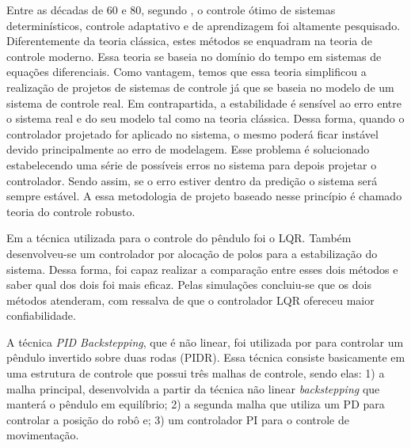 Entre as décadas de 60 e 80, segundo \cite{Ogata}, o controle ótimo de sistemas determinísticos, controle adaptativo e de aprendizagem foi altamente pesquisado. Diferentemente da teoria clássica, estes métodos se enquadram na teoria de controle moderno. Essa teoria se baseia no domínio do tempo em sistemas de equações diferenciais. Como vantagem, temos que essa teoria simplificou a realização de projetos de sistemas de controle já que se baseia no modelo de um sistema de controle real. Em contrapartida, a estabilidade é sensível ao erro entre o sistema real e do seu modelo tal como na teoria clássica. Dessa forma, quando o controlador projetado for aplicado no sistema, o mesmo poderá ficar instável devido principalmente ao erro de modelagem. Esse problema é solucionado estabelecendo uma série de possíveis erros no sistema para depois projetar o controlador. Sendo assim, se o erro estiver dentro da predição o sistema será sempre estável. A essa metodologia de projeto baseado nesse princípio é chamado teoria do controle robusto.



Em \cite{Ooi:03} a técnica utilizada para o controle do pêndulo foi o LQR. Também desenvolveu-se  um controlador por alocação de polos para a estabilização do sistema. Dessa forma, foi capaz realizar a comparação entre esses dois métodos e saber qual dos dois foi mais eficaz. Pelas simulações concluiu-se que os dois métodos atenderam, com ressalva de que o controlador LQR ofereceu maior confiabilidade.

A técnica \textit{PID Backstepping}, que é não linear, foi  utilizada por \cite{PIDBack:10} para controlar um pêndulo invertido sobre duas rodas (PIDR). Essa técnica consiste basicamente em uma estrutura de controle que possui três malhas de controle, sendo elas: 1) a malha principal, desenvolvida a partir da técnica não linear \textit{backstepping} que manterá o pêndulo em equilíbrio; 2) a segunda malha que utiliza um PD para controlar a posição do robô e; 3) um controlador PI para o controle de movimentação.

